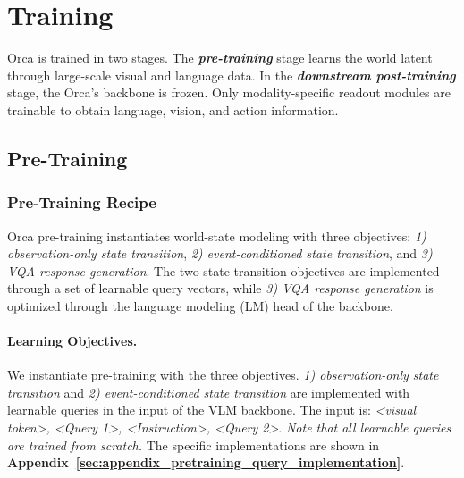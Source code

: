 \documentclass{llmxive}
\providecommand{\currentnavsection}{sec:intro}
\providecommand{\setnavsection}[1]{  \gdef\currentnavsection{#1}}
\begin{document}

\section{Training}\label{sec:training}
\setnavsection{sec:training}

Orca is trained in two stages. The \textbf{\textit{pre-training}} stage learns the world latent through large-scale visual and language data. In the \textbf{\textit{downstream post-training}} stage, the Orca's backbone is frozen. Only modality-specific readout modules are trainable to obtain language, vision, and action information. 

\subsection{Pre-Training}\label{sec:pretraining}


\subsubsection{Pre-Training Recipe}
\label{sec:pretraining_recipe}

Orca pre-training instantiates world-state modeling with three objectives: \textit{1) observation-only state transition}, \textit{2) event-conditioned state transition}, and \textit{3) VQA response generation}. The two state-transition objectives are implemented through a set of learnable query vectors, while \textit{3) VQA response generation} is optimized through the language modeling (LM) head of the backbone. 



\paragraph{Learning Objectives.}
We instantiate pre-training with the three objectives. \textit{1) observation-only state transition} and \textit{2) event-conditioned state transition} are implemented with learnable queries in the input of the VLM backbone. The input is: \textit{<visual token>, <Query 1>, <Instruction>, <Query 2>}. \textit{Note that all learnable queries are trained from scratch.} The specific implementations are shown in \textbf{Appendix~\ref{sec:appendix_pretraining_query_implementation}}.
\end{document}
